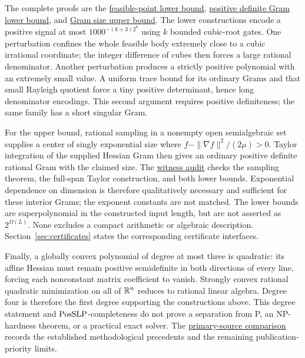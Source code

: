 The complete proofs are the
\href{../../research-20260927/strict-convex-quartic-rational-witness-lower-bound.md}{feasible-point lower bound},
\href{../../research-20260927/interior-gram-bit-lower-bound.md}{positive definite Gram lower bound},
and
\href{../../research-20260927/interior-gram-single-exponential-upper.md}{Gram size upper bound}.
The lower constructions encode a positive signal at most
$1000^{-(k+3)2^k}$ using $k$ bounded cubic-root gates. One
perturbation confines the whole feasible body extremely close to a
cubic irrational coordinate; the integer difference of cubes then
forces a large rational denominator. Another perturbation produces a
strictly positive polynomial with an extremely small value. A uniform
trace bound for its ordinary Grams and that small Rayleigh quotient
force a tiny positive determinant, hence long denominator encodings.
This second argument requires positive definiteness; the same family
has a short singular Gram.

For the upper bound, rational sampling in a nonempty open
semialgebraic set supplies a center of singly exponential size where
$f-\|\nabla f\|^2/(2\mu)>0$. Taylor integration of the supplied
Hessian Gram then gives an ordinary positive definite rational Gram
with the claimed size. The
\href{../reviews/exact-core/witness-review.md}{witness audit}
checks the sampling theorem, the full-span Taylor construction, and
both lower bounds. Exponential dependence on dimension is therefore
qualitatively necessary and sufficient for these interior Grams;
the exponent constants are not matched. The lower bounds are
superpolynomial in the constructed input length, but are not asserted
as $2^{\Omega(L)}$. None excludes a compact arithmetic or algebraic
description. Section~\ref{sec:certificates} states the corresponding
certificate interfaces.

Finally, a globally convex polynomial of degree at most three is
quadratic: its affine Hessian must remain positive semidefinite in
both directions of every line, forcing each nonconstant matrix
coefficient to vanish. Strongly convex rational quadratic minimization
on all of $\mathbb R^n$ reduces to rational linear algebra. Degree four is
therefore the first degree supporting the constructions above. This
degree statement and $\mathrm{PosSLP}$-completeness do not prove a separation
from P, an NP-hardness theorem, or a practical exact solver. The
\href{../literature/exact-prior.md}{primary-source comparison}
records the established methodological precedents and the remaining
publication-priority limits.
